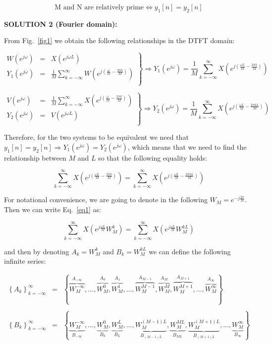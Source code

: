 \documentclass[a4paper,11pt,oneside]{article}
\def\e{{e^{j\omega}}}
\def\sumk{{\sum_{k=-\infty}^{\infty}}}
\begin{document}
\[
\textrm{M and N are relatively prime}  \Leftrightarrow  y_1[n]=y_2[n]
\]





\textbf{SOLUTION 2 (Fourier domain):}



From Fig.~\ref{fig1} we obtain the following relationships in the DTFT domain:

\[
\left.
\begin{array}{lll}
W(\e) &=& X(e^{j\omega L})\\
Y_1(\e)&=&\frac{1}{M}\sumk W\left(e^{j(\frac{\omega}{M}-\frac{2\pi k}{M})}\right)\\
\end{array}
\right\}
\Rightarrow
Y_1(\e)=\frac{1}{M}\sumk X\left(e^{j(\frac{\omega L}{M}-\frac{2\pi k}{M})}\right)
\]


\[
\left.
\begin{array}{lll}
V(\e) &=& \frac{1}{M}\sumk X\left(e^{j(\frac{\omega}{M}-\frac{2\pi k}{M})}\right)\\
Y_2(\e)&=&V(e^{j\omega L})\\
\end{array}
\right\}
\Rightarrow
Y_2(\e)=\frac{1}{M}\sumk X\left(e^{j(\frac{\omega L}{M}-\frac{2\pi k L}{M})}\right)
\]

Therefore, for the two systems to be equivalent we need that $y_1[n]=y_2[n]\Rightarrow Y_1(\e)=Y_2(\e)$, which means that we need to find the relationship between $M$ and $L$ so that the following equality holds:

\begin{equation}\label{eq1}
\sumk X\left(e^{j(\frac{\omega L}{M}-\frac{2\pi k}{M})}\right) = \sumk X\left(e^{j(\frac{\omega L}{M}-\frac{2\pi k L}{M})}\right)
\end{equation}

For notational convenience, we are going to denote in the following $W_M=e^{-j\frac{2\pi}{M}}$. Then we can write Eq.~\ref{eq1} as:


\begin{equation}\label{eq2}
\sumk X\left(e^{j\frac{\omega L}{M}} W_{M}^{k}\right) = \sumk X\left(e^{j\frac{\omega L}{M}}W_{M}^{kL}\right)
\end{equation}

and then by denoting $A_{k}=W_{M}^k$ and $B_{k}=W_{M}^{kL}$ we can define the following infinite series:

\[
\begin{array}{lll}
\left\{A_{k}\right\}_{k=-\infty}^{\infty}&=&\left\{\overbrace{W_{M}^{-\infty}}^{A_{-\infty}},...,\overbrace{W_{M}^{0}}^{A_{0}},\overbrace{W_{M}^1}^{A_1},...,\overbrace{W_{M}^{M-1}}^{A_{M-1}},\overbrace{W_{M}^{M}}^{A_M},\overbrace{W_{M}^{M+1}}^{A_{M+1}},...,\overbrace{W_{M}^{\infty}}^{A_{\infty}}\right\}\\
&&\\
\left\{B_{k}\right\}_{k=-\infty}^{\infty}&=&\left\{\underbrace{W_{M}^{-\infty}}_{B_{-\infty}},...,\underbrace{W_{M}^{0}}_{B_0},\underbrace{W_{M}^L}_{B_L},...,\underbrace{W_{M}^{(M-1)L}}_{B_{(M-1)L}},\underbrace{W_{M}^{ML}}_{B_{ML}},\underbrace{W_{M}^{(M+1)L}}_{B_{(M+1)L}},...,\underbrace{W_{M}^{\infty}}_{B_\infty}\right\}
\end{array}
\]
\end{document}
